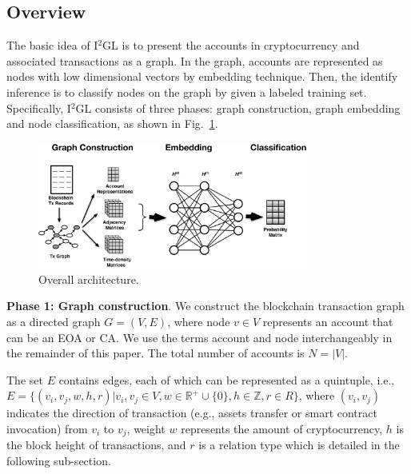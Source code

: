 \subsection{Overview}
\label{subsec:methodology}
The basic idea of I$^2$GL is to present the accounts in cryptocurrency and associated transactions as a graph. In the graph, accounts are represented as nodes with low dimensional vectors by embedding technique. Then, the identify inference is to classify nodes on the graph by given a labeled training set. Specifically, I$^2$GL consists of three phases: graph construction, graph embedding and node classification, as shown in Fig.~\ref{fig:architecture}.

\begin{figure}[htbp]
	\centering
	\includegraphics[width=3.5in]{fig/architecture.eps}
	\caption{Overall architecture.}
	\label{fig:architecture}
\end{figure}

\textbf{Phase 1: Graph construction}. We construct the blockchain transaction graph as a directed graph $G=(V,E)$, where node $v \in V$ represents an account that can be an EOA or CA. We use the terms account and node interchangeably in the remainder of this paper. The total number of accounts is $N=|V|$.

The set $E$ contains edges, each of which can be represented as a quintuple, i.e., $E=\{(v_i,v_j,w,h,r)|v_i,v_j \in V, w\in \mathbb{R}^+ \cup\{0\}, h\in \mathbb{Z}, r\in R\}$, where $(v_{i},v_{j})$ indicates the direction of transaction (e.g., assets transfer or smart contract invocation) from $v_i$ to $v_j$, weight $w$ represents the amount of cryptocurrency, $h$ is the block height of transactions, and $r$ is a relation type which is detailed in the following sub-section.


